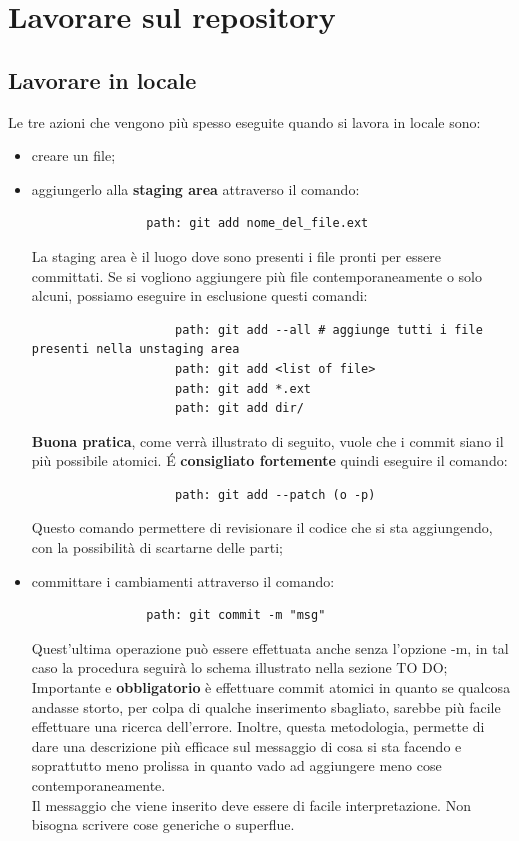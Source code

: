 	

\newpage \clearpage
\section{Lavorare sul repository} %
\label{sec:lavorare_sul_repository}

	\subsection{Lavorare in locale} %
	\label{sub:lavorare_in_locale}
	Le tre azioni che vengono più spesso eseguite quando si lavora in locale sono:
		\begin{itemize}
			\item creare un file;
			\item aggiungerlo alla \textbf{staging area} attraverso il comando:
				\begin{verbatim}
				path: git add nome_del_file.ext
				\end{verbatim}
				\noindent
				La staging area è il luogo dove sono presenti i file pronti per essere committati.
				Se si vogliono aggiungere più file contemporaneamente o solo alcuni, possiamo eseguire in esclusione questi comandi:
					\begin{verbatim}
					path: git add --all # aggiunge tutti i file presenti nella unstaging area
					path: git add <list of file>
					path: git add *.ext
					path: git add dir/
					\end{verbatim}
				\noindent
				\textbf{Buona pratica}, come verrà illustrato di seguito, vuole che i commit siano il più possibile atomici. \'E \textbf{consigliato fortemente} quindi eseguire il comando:
					\begin{verbatim}
					path: git add --patch (o -p)
					\end{verbatim}
				\noindent
				Questo comando permettere di revisionare il codice che si sta aggiungendo, con la possibilità di scartarne delle parti;

			\item committare i cambiamenti attraverso il comando:
				\begin{verbatim}
				path: git commit -m "msg"
				\end{verbatim}
				\noindent
				Quest'ultima operazione può essere effettuata anche senza l'opzione -m, in tal caso la procedura seguirà lo schema illustrato nella sezione TO DO; \\
				Importante e \textbf{obbligatorio} è effettuare commit atomici in quanto se qualcosa andasse storto, per colpa di qualche inserimento sbagliato, sarebbe più facile effettuare una ricerca dell'errore. Inoltre, questa metodologia, permette di dare una descrizione più efficace sul messaggio di cosa si sta facendo e soprattutto meno prolissa in quanto vado ad aggiungere meno cose contemporaneamente. \\
				Il messaggio che viene inserito deve essere di facile interpretazione. Non bisogna scrivere cose generiche o superflue.
				 
		\end{itemize}
